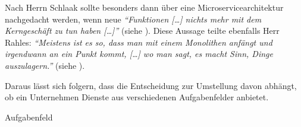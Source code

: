 Nach Herrn Schlaak sollte besonders dann über eine Microservicearchitektur nachgedacht werden, wenn neue \textit{\enquote{Funktionen […] nichts mehr mit dem Kerngeschäft zu tun haben […]}} (siehe ). Diese Aussage teilte ebenfalls Herr Rahles: \textit{\enquote{Meistens ist es so, dass man mit einem Monolithen anfängt und irgendwann an ein Punkt kommt, […] wo man sagt, es macht Sinn, Dinge auszulagern.}} (siehe ).

Daraus lässt sich folgern, dass die Entscheidung zur Umstellung davon abhängt, ob ein Unternehmen Dienste aus verschiedenen Aufgabenfelder anbietet.

Aufgabenfeld

